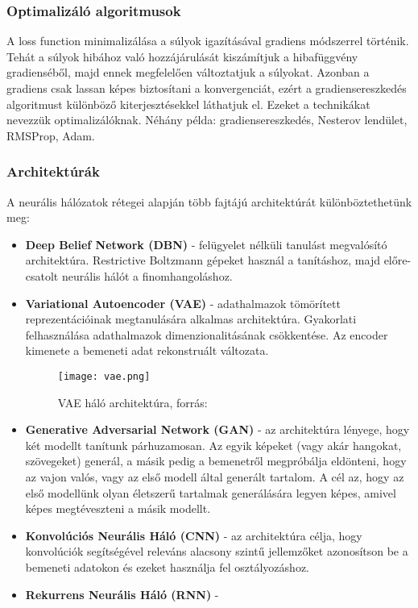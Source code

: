 \subsubsection{Optimalizáló algoritmusok}

A loss function minimalizálása a súlyok igazításával gradiens módszerrel történik. Tehát a súlyok hibához való hozzájárulását kiszámítjuk a hibafüggvény gradienséből, majd ennek megfelelően változtatjuk a súlyokat. Azonban a gradiens csak lassan képes biztosítani a konvergenciát, ezért a gradiensereszkedés algoritmust különböző kiterjesztésekkel láthatjuk el. Ezeket a technikákat nevezzük optimalizálóknak. Néhány példa: gradiensereszkedés, Nesterov lendület, RMSProp, Adam. \cite{deeplearningbook}

\subsubsection{Architektúrák}

A neurális hálózatok rétegei alapján több fajtájú architektúrát különböztethetünk meg:

\begin{itemize}
 \item \textbf{Deep Belief Network (DBN)} - felügyelet nélküli tanulást megvalósító architektúra. Restrictive Boltzmann gépeket használ a tanításhoz, majd előre-csatolt neurális hálót a finomhangoláshoz.
 \item \textbf{Variational Autoencoder (VAE)} - adathalmazok tömörített reprezentációinak megtanulására alkalmas architektúra. Gyakorlati felhasználása adathalmazok dimenzionalitásának csökkentése. Az encoder kimenete a bemeneti adat rekonstruált változata.
\begin{figure}[H]
  \centering
  \texttt{[image: vae.png]}
  \caption{VAE háló architektúra, forrás: \cite{deeplearningbook}}
\end{figure}
 \item \textbf{Generative Adversarial Network (GAN)} - az architektúra lényege, hogy két modellt tanítunk párhuzamosan. Az egyik képeket (vagy akár hangokat, szövegeket) generál, a másik pedig a bemenetről megpróbálja eldönteni, hogy az vajon valós, vagy az első modell által generált tartalom. A cél az, hogy az első modellünk olyan életszerű tartalmak generálására legyen képes, amivel képes megtéveszteni a másik modellt.
 \item \textbf{Konvolúciós Neurális Háló (CNN)} - az architektúra célja, hogy konvolúciók segítségével releváns alacsony szintű jellemzőket azonosítson be a bemeneti adatokon és ezeket használja fel osztályozáshoz.
 


 \item \textbf{Rekurrens Neurális Háló (RNN)} -  \cite{deeplearningbook}

\end{itemize}
